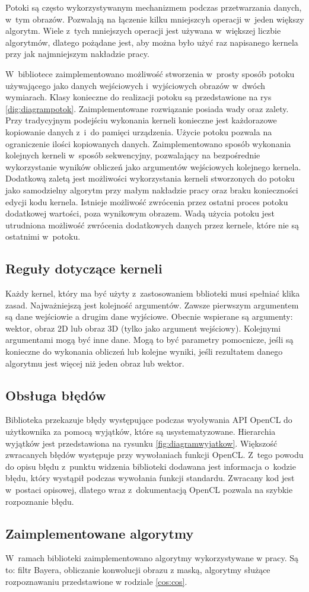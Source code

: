 Potoki są często wykorzystywanym mechanizmem podczas przetwarzania danych, w~tym obrazów. Pozwalają na łączenie kilku mniejszcyh operacji w~jeden większy algorytm. Wiele z~tych mniejszych operacji jest używana w~większej liczbie algorytmów, dlatego pożądane jest, aby można było użyć raz napisanego kernela przy jak najmniejszym nakładzie pracy.

W~bibliotece zaimplementowano możliwość stworzenia w~prosty sposób potoku używającego jako danych wejściowych i~wyjściowych obrazów w~dwóch wymiarach. Klasy konieczne do realizacji potoku są przedstawione na rys \ref{dig:diagrampotok}. Zaimplementowane rozwiązanie posiada wady oraz zalety. Przy tradycyjnym podejściu wykonania kerneli konieczne jest każdorazowe kopiowanie danych z~i~do pamięci urządzenia. Użycie potoku pozwala na ograniczenie ilości kopiowanych danych. Zaimplementowano sposób wykonania kolejnych kerneli w~sposób sekwencyjny, pozwalający na bezpośrednie wykorzystanie wyników obliczeń jako argumentów wejściowych kolejnego kernela. Dodatkową zaletą jest możliwości wykorzystania kerneli stworzonych do potoku jako samodzielny algorytm przy małym nakładzie pracy oraz braku konieczności edycji kodu kernela. Istnieje możliwość zwrócenia przez ostatni proces potoku dodatkowej wartości, poza wynikowym obrazem. Wadą użycia potoku jest utrudniona możliwość zwrócenia dodatkowych danych przez kernele, które nie są ostatnimi w~potoku.

\subsection{Reguły dotyczące kerneli}
\label{subsec:regulykerneli}

Każdy kernel, który ma być użyty z~zastosowaniem bblioteki musi spełniać klika zasad. Najważniejszą jest kolejność argumentów. Zawsze pierwszym argumentem są dane wejściowie a drugim dane wyjściowe. Obecnie wspierane są argumenty: wektor, obraz 2D lub obraz 3D (tylko jako argument wejściowy). Kolejnymi argumentami mogą być inne dane. Mogą to być parametry pomocnicze, jeśli są konieczne do wykonania obliczeń lub kolejne wyniki, jeśli rezultatem danego algorytmu jest więcej niż jeden obraz lub wektor.

\subsection{Obsługa błędów}
\label{subsec:obslugabledow}

Biblioteka przekazuje błędy występujące podczas wyoływania API OpenCL do użytkownika za pomocą wyjątków, które są usystematyzowane. Hierarchia wyjątków jest przedstawiona na rysunku \ref{fig:diagramwyjatkow}. Większość zwracanych błędów występuje przy wywołaniach funkcji OpenCL. Z~tego powodu do opisu błędu z~punktu widzenia biblioteki dodawana jest informacja o~kodzie błędu, który wystąpił podczas wywołania funkcji standardu. Zwracany kod jest w~postaci opisowej, dlatego wraz z~dokumentacją OpenCL pozwala na szybkie rozpoznanie błędu.

\subsection{Zaimplementowane algorytmy}
\label{subsec:algorytmy}

W~ramach biblioteki zaimplementowano algorytmy wykorzystywane w pracy. Są to: filtr Bayera, obliczanie konwolucji obrazu z maską, algorytmy służące rozpoznawaniu przedstawione w rodziale \ref{cos:cos}.